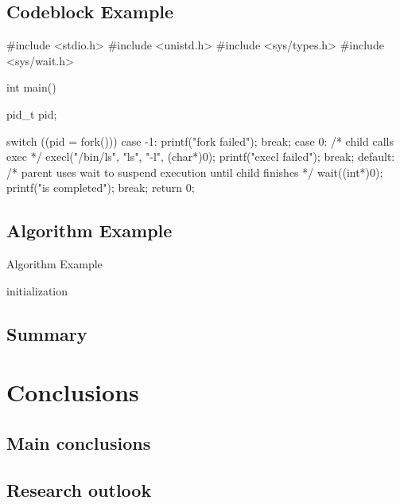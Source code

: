 \section{Codeblock Example}

\begin{codeblock}[language=C]
#include <stdio.h>
#include <unistd.h>
#include <sys/types.h>
#include <sys/wait.h>

int main() {
  pid_t pid;

  switch ((pid = fork())) {
  case -1:
    printf("fork failed\n");
    break;
  case 0:
    /* child calls exec */
    execl("/bin/ls", "ls", "-l", (char*)0);
    printf("execl failed\n");
    break;
  default:
    /* parent uses wait to suspend execution until child finishes */
    wait((int*)0);
    printf("is completed\n");
    break;
  }
  return 0;
}
\end{codeblock}

\section{Algorithm Example}

\begin{algorithm}[htb]
  \caption{Algorithm Example}
  \label{algo:algorithm}
  \small
  \SetAlgoLined

  initialization\;
\end{algorithm}

\section{Summary}

\lipsum[7]

\chapter{Conclusions}

\section{Main conclusions}

\lipsum[8]

\section{Research outlook}

\lipsum[9]

